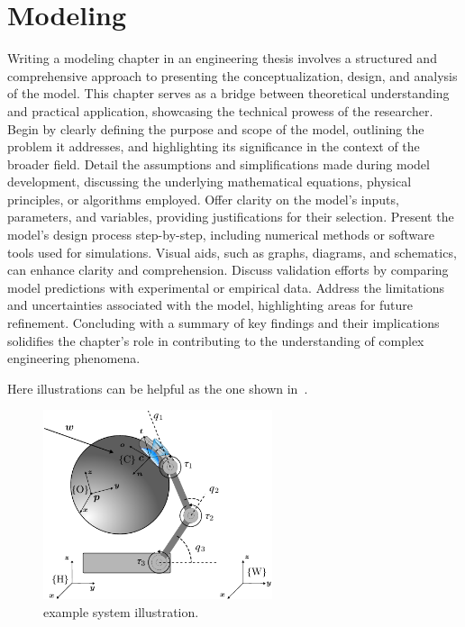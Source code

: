 
\chapter{Modeling} \label{ch:modeling}

Writing a modeling chapter in an engineering thesis involves a structured and comprehensive approach to presenting the conceptualization, design, and analysis of the model. This chapter serves as a bridge between theoretical understanding and practical application, showcasing the technical prowess of the researcher. Begin by clearly defining the purpose and scope of the model, outlining the problem it addresses, and highlighting its significance in the context of the broader field. Detail the assumptions and simplifications made during model development, discussing the underlying mathematical equations, physical principles, or algorithms employed. Offer clarity on the model's inputs, parameters, and variables, providing justifications for their selection. Present the model's design process step-by-step, including numerical methods or software tools used for simulations. Visual aids, such as graphs, diagrams, and schematics, can enhance clarity and comprehension. Discuss validation efforts by comparing model predictions with experimental or empirical data. Address the limitations and uncertainties associated with the model, highlighting areas for future refinement. Concluding with a summary of key findings and their implications solidifies the chapter's role in contributing to the understanding of complex engineering phenomena. \medskip

Here illustrations can be helpful as the one shown in~.

%
\begin{figure}[h]
	\begin{small}
		\begin{center}
			\includegraphics[width=0.6\textwidth]{img/sys-schematic-reversed-crop.pdf}
		\end{center}
		\caption{example system illustration.}
		\label{fig:sys-schematic}
	\end{small}
\end{figure}
